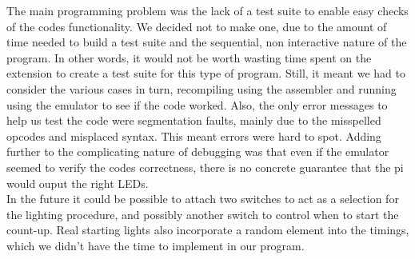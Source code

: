 The main programming problem was the lack of a test suite to enable easy checks of the codes functionality. We decided not to make one, due to the amount of time needed to build a test suite and the sequential, non interactive nature of the program. In other words, it would not be worth wasting time spent on the extension to create a test suite for this type of program. Still, it meant we had to consider the various cases in turn, recompiling using the assembler and running using the emulator to see if the code worked. Also, the only error messages to help us test the code were segmentation faults, mainly due to the misspelled opcodes and misplaced syntax. This meant errors were hard to spot. Adding further to the complicating nature of debugging was that even if the emulator seemed to verify the codes correctness, there is no concrete guarantee that the pi would ouput the right LEDs.
~\\

In the future it could be possible to attach two switches to act as a selection for the lighting procedure, and possibly another switch to control when to start the count-up. Real starting lights also incorporate a random element into the timings, which we didn't have the time to implement in our program.
